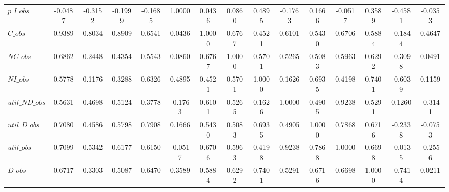 \begin{center}
\begin{longtable}{lcccccccccccccc}
$p\_I\_obs      $	 & 	          -0.0487	 & 	          -0.3152	 & 	          -0.1999	 & 	          -0.1685	 & 	           1.0000	 & 	           0.0436	 & 	           0.0860	 & 	           0.4895	 & 	          -0.1763	 & 	           0.1666	 & 	          -0.0517	 & 	           0.3589	 & 	          -0.4581	 & 	          -0.0353 \\ 
$C\_obs         $	 & 	           0.9389	 & 	           0.8034	 & 	           0.8909	 & 	           0.6541	 & 	           0.0436	 & 	           1.0000	 & 	           0.6767	 & 	           0.4521	 & 	           0.6101	 & 	           0.5430	 & 	           0.6706	 & 	           0.5884	 & 	          -0.1844	 & 	           0.4647 \\ 
$NC\_obs        $	 & 	           0.6862	 & 	           0.2448	 & 	           0.4354	 & 	           0.5543	 & 	           0.0860	 & 	           0.6767	 & 	           1.0000	 & 	           0.5701	 & 	           0.5265	 & 	           0.5083	 & 	           0.5963	 & 	           0.6292	 & 	          -0.3098	 & 	           0.0491 \\ 
$NI\_obs        $	 & 	           0.5778	 & 	           0.1176	 & 	           0.3288	 & 	           0.6326	 & 	           0.4895	 & 	           0.4521	 & 	           0.5701	 & 	           1.0000	 & 	           0.1626	 & 	           0.6935	 & 	           0.4198	 & 	           0.7401	 & 	          -0.6039	 & 	           0.1159 \\ 
$util\_ND\_obs  $	 & 	           0.5631	 & 	           0.4698	 & 	           0.5124	 & 	           0.3778	 & 	          -0.1763	 & 	           0.6101	 & 	           0.5265	 & 	           0.1626	 & 	           1.0000	 & 	           0.4905	 & 	           0.9238	 & 	           0.5291	 & 	           0.1260	 & 	          -0.3141 \\ 
$util\_D\_obs   $	 & 	           0.7080	 & 	           0.4586	 & 	           0.5798	 & 	           0.7908	 & 	           0.1666	 & 	           0.5430	 & 	           0.5083	 & 	           0.6935	 & 	           0.4905	 & 	           1.0000	 & 	           0.7868	 & 	           0.6716	 & 	          -0.2338	 & 	          -0.0753 \\ 
$util\_obs      $	 & 	           0.7099	 & 	           0.5342	 & 	           0.6177	 & 	           0.6150	 & 	          -0.0517	 & 	           0.6706	 & 	           0.5963	 & 	           0.4198	 & 	           0.9238	 & 	           0.7868	 & 	           1.0000	 & 	           0.6698	 & 	          -0.0135	 & 	          -0.2556 \\ 
$D\_obs         $	 & 	           0.6717	 & 	           0.3303	 & 	           0.5087	 & 	           0.6470	 & 	           0.3589	 & 	           0.5884	 & 	           0.6292	 & 	           0.7401	 & 	           0.5291	 & 	           0.6716	 & 	           0.6698	 & 	           1.0000	 & 	          -0.7414	 & 	           0.0211 \\ 

\end{longtable}
\end{center}
